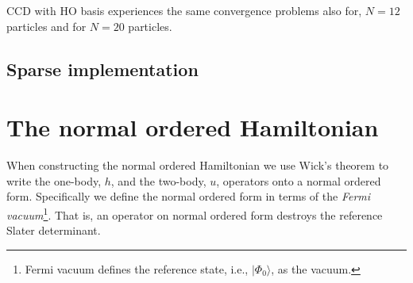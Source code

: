 \documentclass[
    a4paper, aps, twocolumn, floatfix, superscriptaddress,
    nofootinbib]{revtex4-1}
\newcommand{\1}{\mathds{1}}
\newcommand{\ket}[1]{\rvert #1\rangle}
\newcommand{\kslat}{\ket{\Phi_0}}
\begin{document}
        CCD with HO basis experiences the same convergence problems also for,
        $N=12$ particles and for $N=20$ particles.

    \subsection{Sparse implementation}

\appendix
\section{The normal ordered Hamiltonian}
    When constructing the normal ordered Hamiltonian we use Wick's theorem to
    write the one-body, $h$, and the two-body, $u$, operators onto a normal
    ordered form. Specifically we define the normal ordered form in terms of the
    \emph{Fermi vacuum}\footnote{Fermi vacuum defines the reference state, i.e.,
    $\kslat$, as the vacuum.}. That is, an operator on normal ordered form
    destroys the reference Slater determinant.
\end{document}
